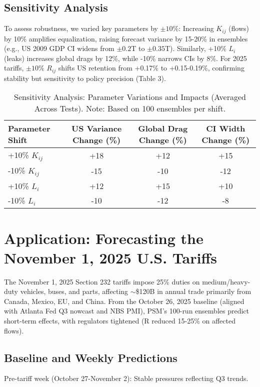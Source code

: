 \documentclass[11pt]{article}
\begin{document}
\subsection{Sensitivity Analysis}
To assess robustness, we varied key parameters by $\pm 10\%$: Increasing $K_{ij}$ (flows) by 10\% amplifies equalization, raising forecast variance by 15-20\% in ensembles (e.g., US 2009 GDP CI widens from $\pm 0.2$T to $\pm 0.35$T). Similarly, +10\% $L_i$ (leaks) increases global drags by 12\%, while -10\% narrows CIs by 8\%. For 2025 tariffs, $\pm 10\%$ $R_{ij}$ shifts US retention from +0.17\% to +0.15-0.19\%, confirming stability but sensitivity to policy precision (Table 3).

\begin{table}[h]
\centering
\small
\begin{tabular}{lccc}
\toprule
Parameter Shift & US Variance Change (\%) & Global Drag Change (\%) & CI Width Change (\%) \\
\midrule
+10\% $K_{ij}$ & +18 & +12 & +15 \\
-10\% $K_{ij}$ & -15 & -10 & -12 \\
+10\% $L_i$ & +12 & +15 & +10 \\
-10\% $L_i$ & -10 & -12 & -8 \\
\bottomrule
\end{tabular}
\caption{Sensitivity Analysis: Parameter Variations and Impacts (Averaged Across Tests). Note: Based on 100 ensembles per shift.}
\label{tab:sensitivity}
\end{table}

\section{Application: Forecasting the November 1, 2025 U.S. Tariffs}
The November 1, 2025 Section 232 tariffs impose 25\% duties on medium/heavy-duty vehicles, buses, and parts, affecting $\sim$\$120B in annual trade primarily from Canada, Mexico, EU, and China. From the October 26, 2025 baseline (aligned with Atlanta Fed Q3 nowcast and NBS PMI), PSM's 100-run ensembles predict short-term effects, with regulators tightened (R reduced 15-25\% on affected flows).

\subsection{Baseline and Weekly Predictions}
Pre-tariff week (October 27-November 2): Stable pressures reflecting Q3 trends.
\end{document}
